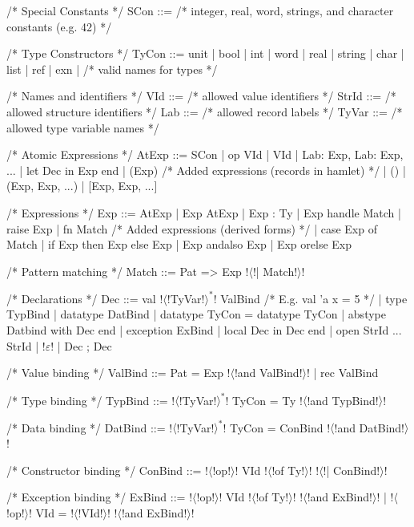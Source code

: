 \documentclass[a4paper,11pt]{article}
\begin{document}
\begin{grm}
/* Special Constants */
SCon ::= /* integer, real, word, strings, 
            and character constants (e.g. 42) */

/* Type Constructors */
TyCon ::= unit   | bool | int  | word | real
        | string | char | list | ref  | exn
        | /* valid names for types */

/* Names and identifiers */
VId   ::= /* allowed value identifiers */
StrId ::= /* allowed structure identifiers */
Lab   ::= /* allowed record labels */
TyVar ::= /* allowed type variable names */

/* Atomic Expressions */
AtExp ::= SCon 
        | op VId 
        | VId 
        | {Lab: Exp, Lab: Exp, ...} 
        | let Dec in Exp end 
        | (Exp) 
        /* Added expressions (records in hamlet) */
        | () 
        | (Exp, Exp, ...) 
        | [Exp, Exp, ...]

/* Expressions */
Exp ::= AtExp 
      | Exp AtExp 
      | Exp : Ty 
      | Exp handle Match
      | raise Exp 
      | fn Match
      /* Added expressions (derived forms) */
      | case Exp of Match 
      | if Exp then Exp else Exp
      | Exp andalso Exp 
      | Exp orelse Exp

/* Pattern matching */
Match ::= Pat => Exp !$\langle$!| Match!$\rangle$!

/* Declarations */
Dec ::= val !$\langle$!TyVar!$\rangle^*$! ValBind /* E.g. val 'a x = 5 */
      | type TypBind
      | datatype DatBind
      | datatype TyCon = datatype TyCon
      | abstype Datbind with Dec end
      | exception ExBind
      | local Dec in Dec end
      | open StrId ... StrId
      | !$\varepsilon$!
      | Dec ; Dec
      
/* Value binding */
ValBind ::= Pat = Exp !$\langle$!and ValBind!$\rangle$!
          | rec ValBind

/* Type binding */
TypBind ::= !$\langle$!TyVar!$\rangle^*$!  TyCon = Ty !$\langle$!and TypBind!$\rangle$!

/* Data binding */
DatBind ::= !$\langle$!TyVar!$\rangle^*$!  TyCon = ConBind !$\langle$!and DatBind!$\rangle$!

/* Constructor binding */
ConBind ::= !$\langle$!op!$\rangle$! VId !$\langle$!of Ty!$\rangle$! !$\langle$!| ConBind!$\rangle$!

/* Exception binding */
ExBind ::= !$\langle$!op!$\rangle$! VId !$\langle$!of Ty!$\rangle$! !$\langle$!and ExBind!$\rangle$!
         | !$\langle$!op!$\rangle$! VId = !$\langle$!VId!$\rangle$! !$\langle$!and ExBind!$\rangle$!


\end{grm}
\end{document}
